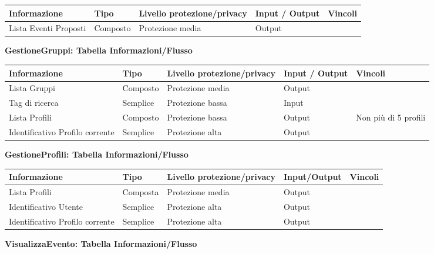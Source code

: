 \begin{tabular} {|P{3cm}|P{3cm}|P{3cm}|P{3cm}|P{3cm}|}
    \hline
    \textbf{Informazione} & \textbf{Tipo} & \textbf{Livello protezione/privacy} & \textbf{Input / Output} & \textbf{Vincoli} \\
    \hline
    Lista Eventi Proposti & Composto      & Protezione media                    & Output                  &                  \\
    \hline
\end{tabular}
\hfill \break

\textbf{GestioneGruppi: Tabella Informazioni/Flusso}
\hfill \break

\begin{tabular} {|P{3cm}|P{3cm}|P{3cm}|P{3cm}|P{3cm}|}
    \hline
    \textbf{Informazione}           & \textbf{Tipo} & \textbf{Livello protezione/privacy} & \textbf{Input / Output} & \textbf{Vincoli}     \\
    \hline
    Lista Gruppi                    & Composto      & Protezione media                    & Output                  &                      \\
    \hline
    Tag di ricerca                  & Semplice      & Protezione bassa                    & Input                   &                      \\
    \hline
    Lista Profili                   & Composto      & Protezione bassa                    & Output                  & Non più di 5 profili \\
    \hline
    Identificativo Profilo corrente & Semplice      & Protezione alta                     & Output                  &                      \\
    \hline
\end{tabular}
\hfill \break

\textbf{GestioneProfili: Tabella Informazioni/Flusso}
\hfill \break

\begin{tabular} {|P{3cm}|P{3cm}|P{3cm}|P{3cm}|P{3cm}|}
    \hline
    \textbf{Informazione}           & \textbf{Tipo} & \textbf{Livello protezione/privacy} & \textbf{Input/Output} & \textbf{Vincoli} \\
    \hline
    Lista Profili                   & Composta      & Protezione media                    & Output                &                  \\
    \hline
    Identificativo Utente           & Semplice      & Protezione alta                     & Output                &                  \\
    \hline
    Identificativo Profilo corrente & Semplice      & Protezione alta                     & Output                &                  \\
    \hline
\end{tabular}
\hfill \break
\newpage
\textbf{VisualizzaEvento: Tabella Informazioni/Flusso}
\hfill \break

